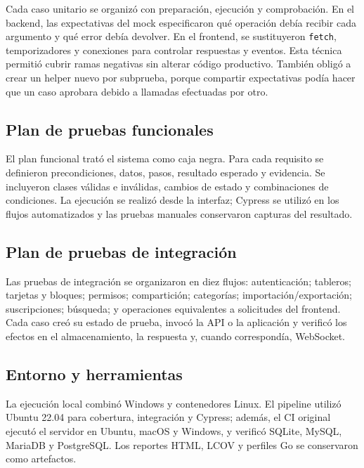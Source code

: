 \documentclass[conference]{IEEEtran}
\begin{document}
Cada caso unitario se organizó con preparación, ejecución y comprobación. En el backend, las expectativas del mock especificaron qué operación debía recibir cada argumento y qué error debía devolver. En el frontend, se sustituyeron \texttt{fetch}, temporizadores y conexiones para controlar respuestas y eventos. Esta técnica permitió cubrir ramas negativas sin alterar código productivo. También obligó a crear un helper nuevo por subprueba, porque compartir expectativas podía hacer que un caso aprobara debido a llamadas efectuadas por otro.
\vspace{\baselineskip}

\subsection{Plan de pruebas funcionales}
El plan funcional trató el sistema como caja negra. Para cada requisito se definieron precondiciones, datos, pasos, resultado esperado y evidencia. Se incluyeron clases válidas e inválidas, cambios de estado y combinaciones de condiciones. La ejecución se realizó desde la interfaz; Cypress se utilizó en los flujos automatizados y las pruebas manuales conservaron capturas del resultado.
\vspace{\baselineskip}

\subsection{Plan de pruebas de integración}
Las pruebas de integración se organizaron en diez flujos: autenticación; tableros; tarjetas y bloques; permisos; compartición; categorías; importación/exportación; suscripciones; búsqueda; y operaciones equivalentes a solicitudes del frontend. Cada caso creó su estado de prueba, invocó la API o la aplicación y verificó los efectos en el almacenamiento, la respuesta y, cuando correspondía, WebSocket.
\vspace{\baselineskip}

\subsection{Entorno y herramientas}
La ejecución local combinó Windows y contenedores Linux. El pipeline utilizó Ubuntu 22.04 para cobertura, integración y Cypress; además, el CI original ejecutó el servidor en Ubuntu, macOS y Windows, y verificó SQLite, MySQL, MariaDB y PostgreSQL. Los reportes HTML, LCOV y perfiles Go se conservaron como artefactos.
\vspace{\baselineskip}
\end{document}
